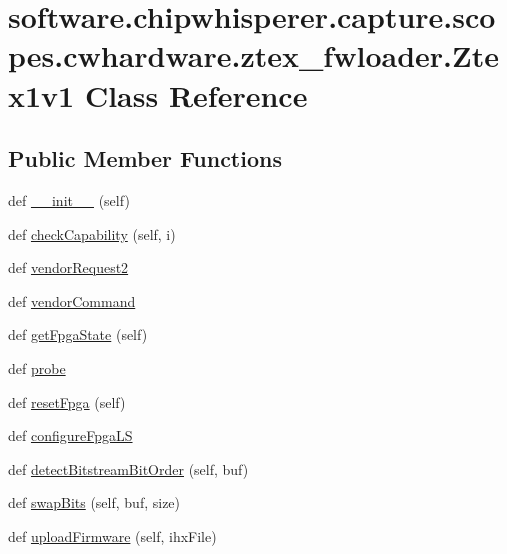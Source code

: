 \hypertarget{classsoftware_1_1chipwhisperer_1_1capture_1_1scopes_1_1cwhardware_1_1ztex__fwloader_1_1Ztex1v1}{}\section{software.\+chipwhisperer.\+capture.\+scopes.\+cwhardware.\+ztex\+\_\+fwloader.\+Ztex1v1 Class Reference}
\label{classsoftware_1_1chipwhisperer_1_1capture_1_1scopes_1_1cwhardware_1_1ztex__fwloader_1_1Ztex1v1}
\subsection*{Public Member Functions}
\begin{DoxyCompactItemize}
\item 
def \hyperlink{classsoftware_1_1chipwhisperer_1_1capture_1_1scopes_1_1cwhardware_1_1ztex__fwloader_1_1Ztex1v1_a3a4ce97a36085813924ce12a5edbcbd6}{\+\_\+\+\_\+init\+\_\+\+\_\+} (self)
\item 
def \hyperlink{classsoftware_1_1chipwhisperer_1_1capture_1_1scopes_1_1cwhardware_1_1ztex__fwloader_1_1Ztex1v1_aeab1075e0ac4bea8aa37fd29804410f0}{check\+Capability} (self, i)
\item 
def \hyperlink{classsoftware_1_1chipwhisperer_1_1capture_1_1scopes_1_1cwhardware_1_1ztex__fwloader_1_1Ztex1v1_a982db4dba4c411e93acf1c0c2003b7a4}{vendor\+Request2}
\item 
def \hyperlink{classsoftware_1_1chipwhisperer_1_1capture_1_1scopes_1_1cwhardware_1_1ztex__fwloader_1_1Ztex1v1_abffc17f31b13db8a13f9460c501ea1c5}{vendor\+Command}
\item 
def \hyperlink{classsoftware_1_1chipwhisperer_1_1capture_1_1scopes_1_1cwhardware_1_1ztex__fwloader_1_1Ztex1v1_a3a9dc104e102b00283aaf6b5a0474a7e}{get\+Fpga\+State} (self)
\item 
def \hyperlink{classsoftware_1_1chipwhisperer_1_1capture_1_1scopes_1_1cwhardware_1_1ztex__fwloader_1_1Ztex1v1_a56fb2ae1d21bcde02d0082982c330ad0}{probe}
\item 
def \hyperlink{classsoftware_1_1chipwhisperer_1_1capture_1_1scopes_1_1cwhardware_1_1ztex__fwloader_1_1Ztex1v1_ace230adc1293b917eb091f83220514ea}{reset\+Fpga} (self)
\item 
def \hyperlink{classsoftware_1_1chipwhisperer_1_1capture_1_1scopes_1_1cwhardware_1_1ztex__fwloader_1_1Ztex1v1_a42ad08d0e44c5ca2fb431d43c345f26a}{configure\+Fpga\+L\+S}
\item 
def \hyperlink{classsoftware_1_1chipwhisperer_1_1capture_1_1scopes_1_1cwhardware_1_1ztex__fwloader_1_1Ztex1v1_a68274512c49a017de663cb37ce1a7b9f}{detect\+Bitstream\+Bit\+Order} (self, buf)
\item 
def \hyperlink{classsoftware_1_1chipwhisperer_1_1capture_1_1scopes_1_1cwhardware_1_1ztex__fwloader_1_1Ztex1v1_a8e5106210d0e16a665f7c3c67aedb667}{swap\+Bits} (self, buf, size)
\item 
def \hyperlink{classsoftware_1_1chipwhisperer_1_1capture_1_1scopes_1_1cwhardware_1_1ztex__fwloader_1_1Ztex1v1_a9ffc0b23a4d2d5c8af1d7cbc78f5df37}{upload\+Firmware} (self, ihx\+File)
\end{DoxyCompactItemize}
